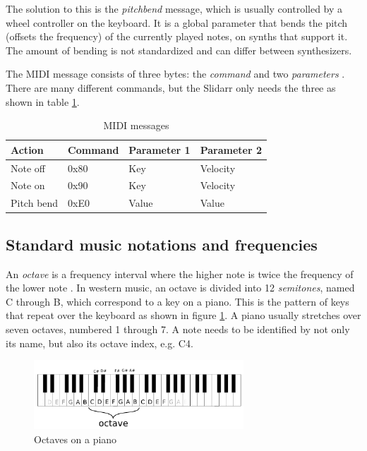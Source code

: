 \documentclass{article}
\begin{document}
The solution to this is the \textit{pitchbend} message, which is usually controlled by a wheel controller on the keyboard. It is a global parameter that bends the pitch (offsets the frequency) of the currently played notes, on synths that support it. The amount of bending is not standardized and can differ between synthesizers.

The MIDI message consists of three bytes: the \textit{command} and two \textit{parameters} \cite{midistanford}. There are many different commands, but the Slidarr only needs the three as shown in table \ref{table:midi_msgs}.

\begin{table}[ht]
  \centering
  \caption{MIDI messages}
  \label{table:midi_msgs}
  \begin{tabular}{llll}
    Action     & Command & Parameter 1 & Parameter 2 \\ \hline
    Note off   & 0x80    & Key         & Velocity    \\
    Note on    & 0x90    & Key         & Velocity    \\
    Pitch bend & 0xE0    & Value       & Value      
  \end{tabular}
\end{table}

\subsection{Standard music notations and frequencies}
An \textit{octave} is a frequency interval where the higher note is twice the frequency of the lower note \cite{octave}. In western music, an octave is divided into 12 \textit{semitones}, named C through B, which correspond to a key on a piano. This is the pattern of keys that repeat over the keyboard as shown in figure \ref{fig:octave}. A piano usually stretches over seven octaves, numbered 1 through 7. A note needs to be identified by not only its name, but also its octave index, e.g. C4.

\begin{figure}[ht]
  \centering
  \includegraphics[width=0.7\textwidth]{octave}
  \caption{Octaves on a piano}
  \label{fig:octave}
\end{figure}
\end{document}
